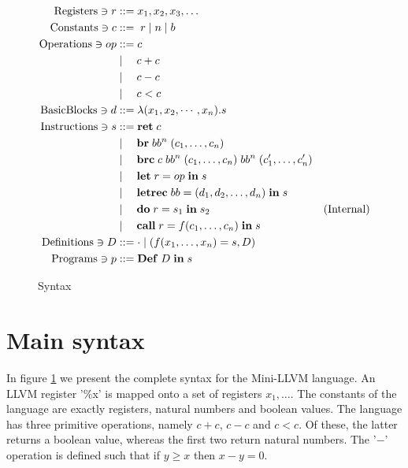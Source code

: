 \documentclass[a4paper, oneside, 10pt, draft]{memoir}
\begin{document}
\newcommand{\ibr}[2]{\mathbf{br} \; #1 \; #2}
\newcommand{\ibrc}[5]{\mathbf{brc} \; #1 \; #2 \; #3 \; #4 \; #5}
\newcommand{\ilet}[3]{\mathbf{let} \; #1 = #2 \; \mathbf{in} \; #3}
\newcommand{\iletrec}[3]{\mathbf{letrec} \; #1 = #2 \; \mathbf{in} \; #3}
\newcommand{\ido}[3]{\mathbf{do} \; #1 = #2 \; \mathbf{in} \; #3}
\newcommand{\icall}[4]{\mathbf{call} \; #1 = #2 #3\; \mathbf{in} \;
  #4}
\newcommand{\ipgm}[2]{\mathbf{Def} \; #1 \; \mathbf{in} \; #2}
\begin{figure}
  \begin{align*}
    \registers \ni r & ::= x_1, x_2, x_3, \dotsc\\
    \constants \ni c & ::= \; r \bor \nat \bor \bool \\
    \operations \ni op & ::= c \\
                       & \bor \quad c + c \\
                       & \bor \quad c - c \\
                       & \bor \quad c < c \\
   \basicblocks \ni d  & ::= \lambda (x_1, x_2, \cdots, x_n) . s\\
   \instructions \ni s & ::= \iret{c} \\
                       & \bor \quad \ibr{bb^n}{(c_1, \dotsc, c_n)} \\
                       & \bor \quad \ibrc{c}{bb^n}{(c_1, \dotsc, c_n)}{bb^n}{(c'_1, \dotsc, c'_n)}\\
                       & \bor \quad \ilet{r}{op}{s} \\
                       & \bor \quad \iletrec{bb}{(d_1, d_2, \dotsc, d_n)}{s} \\
                       & \bor \quad \ido{r}{s_1}{s_2} &
                       (\text{Internal})\\
                       & \bor \quad \icall{r}{f}{(c_1, \dotsc,
                         c_n)}{s}\\
    \definitions \ni D & ::= \cdot \bor (f(x_1, \dotsc, x_n) = s, D)\\
    \programs \ni p & ::= \ipgm{D}{s}
  \end{align*}
  \caption{Syntax}
  \label{fig:syntax}
\end{figure}

\section{Main syntax}

In figure \ref{fig:syntax} we present the complete syntax for the
Mini-LLVM language. An LLVM register '\%x' is mapped onto a set of
registers $x_1, \dotsc$. The constants of the language are exactly
registers, natural numbers and boolean values. The language has three
primitive operations, namely $c + c$, $c - c$ and $c < c$. Of these,
the latter returns a boolean value, whereas the first two return
natural numbers. The '$-$' operation is defined such that if $y \geq x$
then $x - y = 0$.
\end{document}
